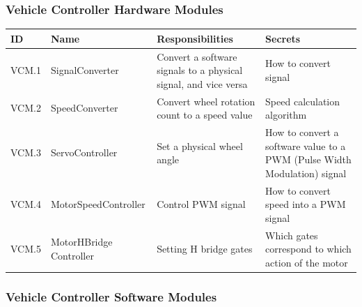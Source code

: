 \documentclass [10pt]{article}
\begin{document}
\subsubsection{Vehicle Controller Hardware Modules}

\begin{longtable}{ |p{ }  | p{ } |  p{ } |  p{ } |}  \hline
    
    \textbf{ID} & \textbf{Name} &  \textbf{Responsibilities} & \textbf{Secrets} \\ \hline 
    
    
    \cellcolor{tableCell}VCM.1  & \cellcolor{tableCell}SignalConverter & \cellcolor{tableCell}Convert a software signals to a physical signal, and vice versa & \cellcolor{tableCell}How to convert signal  \\ \hline
    
    VCM.2 & SpeedConverter & Convert wheel rotation count to a speed value & Speed calculation algorithm \\ \hline
    
    \cellcolor{tableCell}VCM.3  & \cellcolor{tableCell}ServoController & \cellcolor{tableCell}Set a physical wheel angle & 
    \cellcolor{tableCell}How to convert a software value to a PWM (Pulse Width Modulation) signal \\ \hline
    
    VCM.4 & MotorSpeedController & Control PWM signal & How to convert speed into a PWM signal \\ \hline\hline
    
    \cellcolor{tableCell}VCM.5  & \cellcolor{tableCell}MotorHBridge \newline Controller & \cellcolor{tableCell}Setting H bridge gates & \cellcolor{tableCell}Which gates correspond to which action of the motor  \\ \hline
    
    
\end{longtable}


\subsubsection{Vehicle Controller Software Modules}
\end{document}
